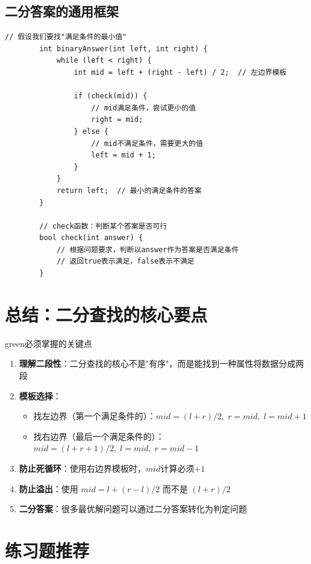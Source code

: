 \documentclass[12pt,a4paper]{article}
\begin{document}
	\subsection{二分答案的通用框架}
	
	\begin{lstlisting}[caption={二分答案的通用模板}]
		// 假设我们要找"满足条件的最小值"
		int binaryAnswer(int left, int right) {
			while (left < right) {
				int mid = left + (right - left) / 2;  // 左边界模板
				
				if (check(mid)) {
					// mid满足条件，尝试更小的值
					right = mid;
				} else {
					// mid不满足条件，需要更大的值
					left = mid + 1;
				}
			}
			return left;  // 最小的满足条件的答案
		}
		
		// check函数：判断某个答案是否可行
		bool check(int answer) {
			// 根据问题要求，判断以answer作为答案是否满足条件
			// 返回true表示满足，false表示不满足
		}
	\end{lstlisting}
	
	\section{总结：二分查找的核心要点}
	
	\begin{mybox}{green}{必须掌握的关键点}
		\begin{enumerate}
			\item \textbf{理解二段性}：二分查找的核心不是"有序"，而是能找到一种属性将数据分成两段
			\item \textbf{模板选择}：
			\begin{itemize}
				\item 找左边界（第一个满足条件的）：$mid = (l+r)/2, \; r = mid, \; l = mid+1$
				\item 找右边界（最后一个满足条件的）：$mid = (l+r+1)/2, \; l = mid, \; r = mid-1$
			\end{itemize}
			\item \textbf{防止死循环}：使用右边界模板时，$mid$计算必须$+1$
			\item \textbf{防止溢出}：使用 $mid = l + (r-l)/2$ 而不是 $(l+r)/2$
			\item \textbf{二分答案}：很多最优解问题可以通过二分答案转化为判定问题
		\end{enumerate}
	\end{mybox}
	
	\section{练习题推荐}
	
\end{document}
